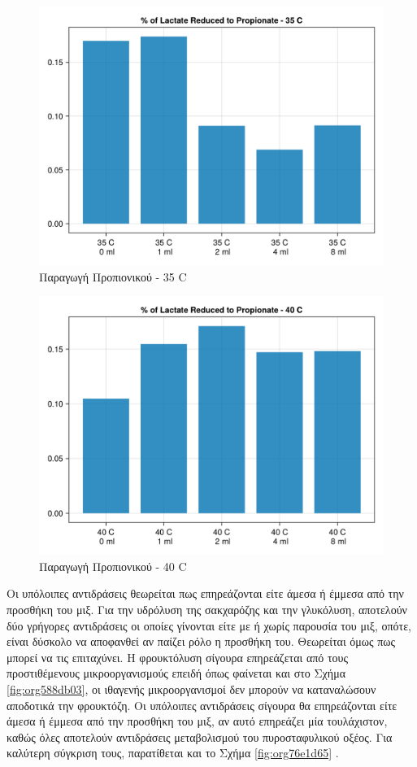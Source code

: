 \documentclass[11pt]{report}
\begin{document}
\begin{figure}[htbp]
\centering
\includegraphics[width=.9\linewidth]{../plots/metabolic_results/propionate_flux_35.png}
\caption{\label{fig:org18efba3}Παραγωγή Προπιονικού - 35 C}
\end{figure}

\begin{figure}[htbp]
\centering
\includegraphics[width=.9\linewidth]{../plots/metabolic_results/propionate_flux_40.png}
\caption{\label{fig:orgfb36eea}Παραγωγή Προπιονικού - 40 C}
\end{figure}

Οι υπόλοιπες αντιδράσεις θεωρείται πως επηρεάζονται είτε άμεσα ή έμμεσα από την προσθήκη του μιξ. Για την υδρόλυση της σακχαρόζης και την γλυκόλυση, αποτελούν δύο γρήγορες αντιδράσεις οι οποίες γίνονται είτε με ή χωρίς παρουσία του μιξ, οπότε, είναι δύσκολο να αποφανθεί αν παίζει ρόλο η προσθήκη του. Θεωρείται όμως πως μπορεί να τις επιταχύνει. Η φρουκτόλυση σίγουρα επηρεάζεται από τους προστιθέμενους μικροοργανισμούς επειδή όπως φαίνεται και στο Σχήμα \ref{fig:org588db03}, οι ιθαγενής μικροοργανισμοί δεν μπορούν να καταναλώσουν αποδοτικά την φρουκτόζη. Οι υπόλοιπες αντιδράσεις σίγουρα θα επηρεάζονται είτε άμεσα ή έμμεσα από την προσθήκη του μιξ, αν αυτό επηρεάζει μία τουλάχιστον, καθώς όλες αποτελούν αντιδράσεις μεταβολισμού του πυροσταφυλικού οξέος. Για καλύτερη σύγκριση τους, παρατίθεται και το Σχήμα \ref{fig:org76e1d65} . 
\end{document}
